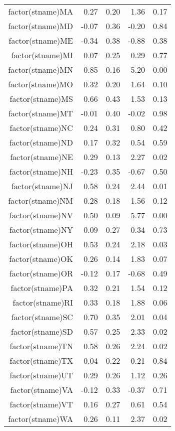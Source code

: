 \begin{table}[ht]
\begin{tabular}{rrrrr}
  factor(stname)MA & 0.27 & 0.20 & 1.36 & 0.17 \\ 
  factor(stname)MD & -0.07 & 0.36 & -0.20 & 0.84 \\ 
  factor(stname)ME & -0.34 & 0.38 & -0.88 & 0.38 \\ 
  factor(stname)MI & 0.07 & 0.25 & 0.29 & 0.77 \\ 
  factor(stname)MN & 0.85 & 0.16 & 5.20 & 0.00 \\ 
  factor(stname)MO & 0.32 & 0.20 & 1.64 & 0.10 \\ 
  factor(stname)MS & 0.66 & 0.43 & 1.53 & 0.13 \\ 
  factor(stname)MT & -0.01 & 0.40 & -0.02 & 0.98 \\ 
  factor(stname)NC & 0.24 & 0.31 & 0.80 & 0.42 \\ 
  factor(stname)ND & 0.17 & 0.32 & 0.54 & 0.59 \\ 
  factor(stname)NE & 0.29 & 0.13 & 2.27 & 0.02 \\ 
  factor(stname)NH & -0.23 & 0.35 & -0.67 & 0.50 \\ 
  factor(stname)NJ & 0.58 & 0.24 & 2.44 & 0.01 \\ 
  factor(stname)NM & 0.28 & 0.18 & 1.56 & 0.12 \\ 
  factor(stname)NV & 0.50 & 0.09 & 5.77 & 0.00 \\ 
  factor(stname)NY & 0.09 & 0.27 & 0.34 & 0.73 \\ 
  factor(stname)OH & 0.53 & 0.24 & 2.18 & 0.03 \\ 
  factor(stname)OK & 0.26 & 0.14 & 1.83 & 0.07 \\ 
  factor(stname)OR & -0.12 & 0.17 & -0.68 & 0.49 \\ 
  factor(stname)PA & 0.32 & 0.21 & 1.54 & 0.12 \\ 
  factor(stname)RI & 0.33 & 0.18 & 1.88 & 0.06 \\ 
  factor(stname)SC & 0.70 & 0.35 & 2.01 & 0.04 \\ 
  factor(stname)SD & 0.57 & 0.25 & 2.33 & 0.02 \\ 
  factor(stname)TN & 0.58 & 0.26 & 2.24 & 0.02 \\ 
  factor(stname)TX & 0.04 & 0.22 & 0.21 & 0.84 \\ 
  factor(stname)UT & 0.29 & 0.26 & 1.12 & 0.26 \\ 
  factor(stname)VA & -0.12 & 0.33 & -0.37 & 0.71 \\ 
  factor(stname)VT & 0.16 & 0.27 & 0.61 & 0.54 \\ 
  factor(stname)WA & 0.26 & 0.11 & 2.37 & 0.02 \\ 

\end{tabular}
\end{table}
